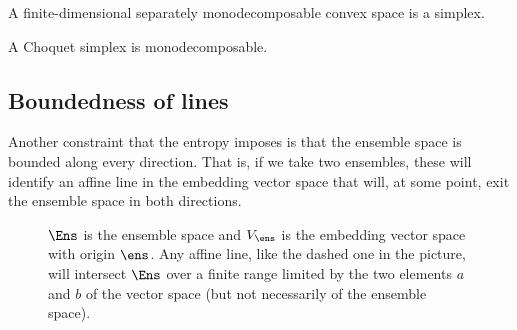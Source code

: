 \begin{conj}\label{em-es-conjSimplexMonodecomposable}
	A finite-dimensional separately monodecomposable convex space is a simplex.
\end{conj}

\begin{conj}\label{em-es-conjChoquetSimplexMonodecomposable}
	A Choquet simplex is monodecomposable.
\end{conj}

\subsection{Boundedness of lines}

Another constraint that the entropy imposes is that the ensemble space is bounded along every direction. That is, if we take two ensembles, these will identify an affine line in the embedding vector space that will, at some point, exit the ensemble space in both directions.

\begin{figure}[h]
	\centering
	\caption{$\Ens$ is the ensemble space and $V_{\ens}$ is the embedding vector space with origin $\ens$. Any affine line, like the dashed one in the picture, will intersect $\Ens$ over a finite range limited by the two elements $a$ and $b$ of the vector space (but not necessarily of the ensemble space).}
\end{figure}

